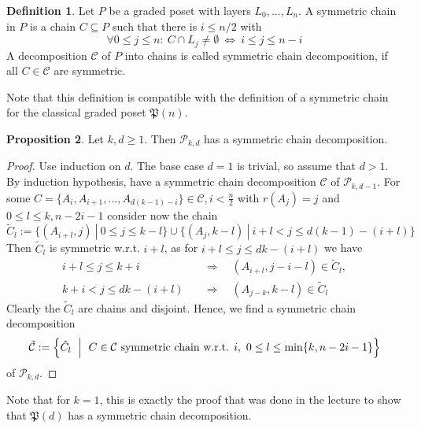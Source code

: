 \documentclass{scrartcl}
\newcommand{\powerset}{\mathfrak{P}}
\theoremstyle{definition}
\newtheorem{definition}{Definition}
\newtheorem{proposition}[definition]{Proposition}
\begin{document}
\begin{definition}
    Let $P$ be a graded poset with layers $L_0, ..., L_n$.
    A symmetric chain in $P$ is a chain $C \subseteq P$ such that there is $i \leq n/2$ with
    \begin{equation*}
        \forall 0 \leq j \leq n: \ C \cap L_j \neq \emptyset \ \Leftrightarrow \ i \leq j \leq n - i
    \end{equation*}
    A decomposition $\mathcal{C}$ of $P$ into chains is called symmetric chain decomposition, if all $C \in \mathcal{C}$ are symmetric.
\end{definition}
Note that this definition is compatible with the definition of a symmetric chain for the classical graded poset $\powerset(n)$.
\begin{proposition}
    Let $k, d \geq 1$. Then $\mathcal{P}_{k, d}$ has a symmetric chain decomposition.
\end{proposition}
\begin{proof}
    Use induction on $d$.
    The base case $d = 1$ is trivial, so assume that $d > 1$.
    By induction hypothesis, have a symmetric chain decomposition $\mathcal{C}$ of $\mathcal{P}_{k, d - 1}$.
    For some $C = \{ A_i, A_{i + 1}, ..., A_{d(k - 1) - i} \} \in \mathcal{C}, i < \frac n 2$ with $r(A_j) = j$ and $0 \leq l \leq k, n - 2i - 1$ consider now the chain
    \begin{equation*}
        \tilde{C}_l := \{ (A_{i + l}, j) \ | \ 0 \leq j \leq k - l \} \cup \{ (A_j, k - l) \ | \ i + l < j \leq d(k - 1) - (i + l) \}
    \end{equation*}
    Then $\tilde{C}_l$ is symmetric w.r.t. $i + l$, as for $i + l \leq j \leq dk - (i + l)$ we have
    \begin{align*}
        i + l \leq j \leq k + i \quad &\Rightarrow \quad (A_{i + l}, j - i - l) \in \tilde{C}_l, \\
        k + i < j \leq dk - (i + l) \quad &\Rightarrow \quad (A_{j - k}, k - l) \in \tilde{C}_l
    \end{align*}
    Clearly the $\tilde{C}_l$ are chains and disjoint.
    Hence, we find a symmetric chain decomposition
    \begin{equation*}
        \tilde{\mathcal{C}} := \Bigl\{ \tilde{C}_l \ \Bigm| \ C \in \mathcal{C} \ \text{symmetric chain w.r.t. $i$}, \ 0 \leq l \leq \min\{ k, n - 2i - 1 \} \Bigr\}
    \end{equation*}
    of $\mathcal{P}_{k, d}$.
\end{proof}
Note that for $k = 1$, this is exactly the proof that was done in the lecture to show that $\powerset(d)$ has a symmetric chain decomposition.
\end{document}

